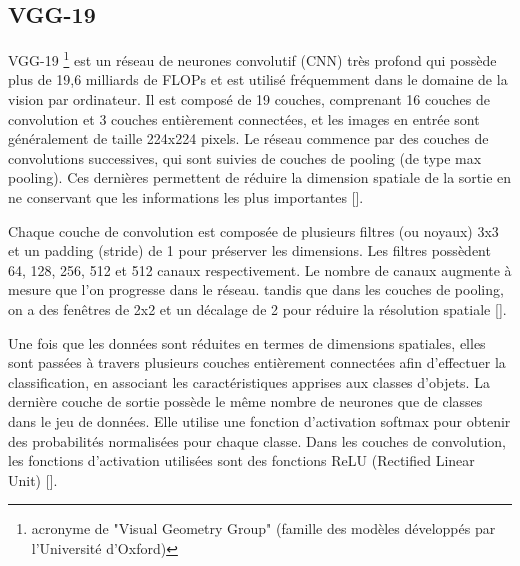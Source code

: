 \subsection{VGG-19}
VGG-19 \footnote{acronyme de "Visual Geometry Group" (famille des modèles développés par l'Université d'Oxford)} est un réseau de neurones convolutif (CNN) très profond qui possède plus de 19,6 milliards de FLOPs et est utilisé fréquemment dans le domaine de la vision par ordinateur. Il est composé de 19 couches, comprenant 16 couches de convolution et 3 couches entièrement connectées, et les images en entrée sont généralement de taille 224x224 pixels. Le réseau commence par des couches de convolutions successives, qui sont suivies de couches de pooling (de type max pooling). Ces dernières permettent de réduire la dimension spatiale de la sortie en ne conservant que les informations les plus importantes [\cite{simonyan2014very}].

Chaque couche de convolution est composée de plusieurs filtres (ou noyaux) 3x3 et un padding (stride) de 1 pour préserver les dimensions. Les filtres possèdent 64, 128, 256, 512 et 512 canaux respectivement. Le nombre de canaux augmente à mesure que l'on progresse dans le réseau. tandis que dans les couches de pooling, on a des fenêtres de 2x2 et un décalage de 2 pour réduire la résolution spatiale [\cite{simonyan2014very}]. 

Une fois que les données sont réduites en termes de dimensions spatiales, elles sont passées à travers plusieurs couches entièrement connectées afin d'effectuer la classification, en associant les caractéristiques apprises aux classes d'objets. La dernière couche de sortie possède le même nombre de neurones que de classes dans le jeu de données. Elle utilise une fonction d'activation softmax pour obtenir des probabilités normalisées pour chaque classe. Dans les couches de convolution, les fonctions d'activation utilisées sont des fonctions ReLU (Rectified Linear Unit) [\cite{simonyan2014very}].


